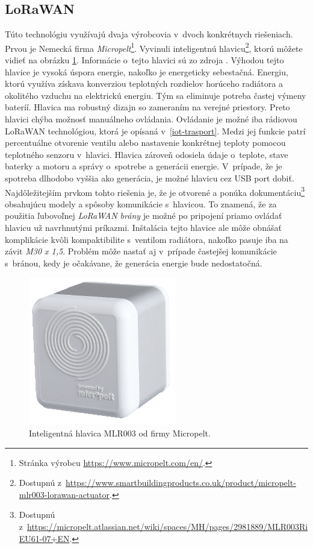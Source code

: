 \subsection*{LoRaWAN}
Túto technológiu využívajú dvaja výrobcovia v~dvoch konkrétnych riešeniach. Prvou je Nemecká firma \emph{Micropelt}\footnote{Stránka výrobcu \url{https://www.micropelt.com/en/}.}. 
Vyvinuli inteligentnú hlavicu\footnote{Dostupnú z~\url{https://www.smartbuildingproducts.co.uk/product/micropelt-mlr003-lorawan-actuator}.}, ktorú môžete vidieť na obrázku \ref{fig:LORA-MICROPELT}. 
Informácie o~tejto hlavici sú zo zdroja \cite{Micropelt_hlavica}. Výhodou tejto hlavice je vysoká úspora energie, nakoľko je energeticky sebestačná. 
Energiu, ktorú využíva získava konverziou teplotných rozdielov horúceho radiátora a okolitého vzduchu na elektrickú energiu. 
Tým sa eliminuje potreba častej výmeny bateríí. Hlavica ma robustný dizajn so zameraním na verejné priestory. 
Preto hlavici chýba možnosť manuálneho ovládania. Ovládanie je možné iba rádiovou LoRaWAN technológiou, ktorá je opísaná v~\ref{iot-trasport}. 
Medzi jej funkcie patrí percentuálne otvorenie ventilu alebo nastavenie konkrétnej teploty pomocou teplotného senzoru v~hlavici. 
Hlavica zároveň odosiela údaje o~teplote, stave baterky a motoru a správy o~spotrebe a generácii energie. 
V~prípade, že je spotreba dlhodobo vyššia ako generácia, je možné hlavicu cez USB port dobiť.
Najdôležitejším prvkom tohto riešenia je, že je otvorené a ponúka dokumentáciu\footnote{Dostupnú z~\url{https://micropelt.atlassian.net/wiki/spaces/MH/pages/2981889/MLR003RiEU61-07+EN}.} obsahujúcu modely a spôsoby komunikácie s~hlavicou. 
To znamená, že za použitia ľubovoľnej \emph{LoRaWAN brány} je možné po pripojení priamo ovládať hlavicu už navrhnutými príkazmi.
Inštalácia tejto hlavice ale môže obnášať komplikácie kvôli kompaktibilite s~ventilom radiátora, nakoľko pasuje iba na závit \emph{M30 x 1,5}. 
Problém môže nastať aj v~prípade častejšej komunikácie s~bránou, kedy je očakávane, že generácia energie bude nedostatočná.

\begin{figure}[H]
    \centering
    \includegraphics[scale=0.5]{obrazky-figures/_MLR003_UK-CERT_980x385_A_edited.png}
    \caption{Inteligentná hlavica MLR003 od firmy Micropelt.}
    \label{fig:LORA-MICROPELT}
\end{figure}


